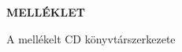 \documentclass[a4paper,oneside,10pt]{report}
\begin{document}
\Large
\begin{center}
	\textbf{MELLÉKLET}
\end{center}
\normalsize
\noindent
A mellékelt CD könyvtárszerkezete







\appendix

\end{document}
